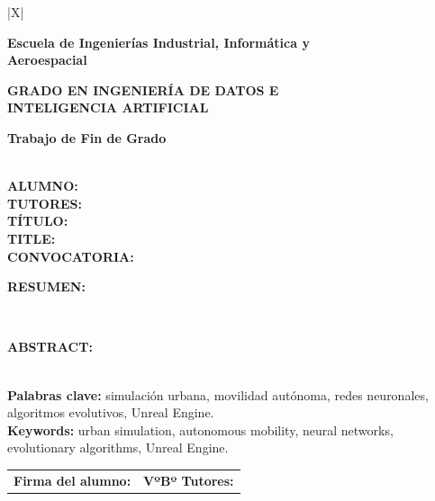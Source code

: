\noindent
\begin{tabularx}{\textwidth}{|X|}
\hline
\begin{center}
  \vspace{0.25cm}
  {\bfseries\fontsize{16}{19}\selectfont \universidad\par}
  \vspace{0.15cm}
  {\bfseries\fontsize{15}{18}\selectfont Escuela de Ingenierías Industrial, Informática y\\Aeroespacial\par}
  \vspace{0.45cm}
  {\bfseries\fontsize{14}{16}\selectfont GRADO EN INGENIERÍA DE DATOS E\\INTELIGENCIA ARTIFICIAL\par}
  \vspace{0.08cm}
  {\bfseries\fontsize{14}{16}\selectfont Trabajo de Fin de Grado\par}
  \vspace{0.25cm}
\end{center}
\\
\hline
\textbf{ALUMNO:} \autor\\
\hline
\textbf{TUTORES:} \tutores\\
\hline
\textbf{TÍTULO:} \tituloTFG\\
\hline
\textbf{TITLE:} \tituloTFGEng\\
\hline
\textbf{CONVOCATORIA:} \convocatoria\\
\hline
\begin{minipage}[t][4.25cm][t]{\dimexpr\linewidth-2\tabcolsep\relax}
\textbf{RESUMEN:}\\[0.06cm]
\resumenFicha%
\end{minipage}\\
\hline
\begin{minipage}[t][4.25cm][t]{\dimexpr\linewidth-2\tabcolsep\relax}
\textbf{ABSTRACT:}\\[0.06cm]
\abstractFicha%
\end{minipage}\\
\hline
\textbf{Palabras clave:} simulación urbana, movilidad autónoma, redes neuronales, algoritmos evolutivos, Unreal Engine.\\
\hline
\textbf{Keywords:} urban simulation, autonomous mobility, neural networks, evolutionary algorithms, Unreal Engine.\\
\hline
\begin{tabular}{p{}|p{}}
\textbf{Firma del alumno:} & \textbf{VºBº Tutores:}\\[1.20cm]
\end{tabular}\\
\hline
\end{tabularx}

